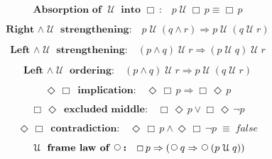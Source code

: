 \documentclass[12pt, fleqn, leqno]{article}
\newcommand{\equivs}{\ensuremath{\;\equiv\;}}       %
\newcommand{\impl}{\ensuremath{\Rightarrow}}        %
\newcommand{\Until}{\;\mathcal{U}\;}
\newcommand{\Next}{\;\,\text{\raisebox{3.5pt}{\circle{6}}}}
\newcommand{\Event}{\Diamond\,}
\newcommand{\Always}{\Box\,}
\newcommand{\spacer}{\vspace{-30pt}}
\newcommand{\firstspacer}{\vspace{-26pt}}
\begin{document}
\firstspacer

\begin{equation}\label{E:axAbsorpUntil}
\textbf{Absorption of $\Until$ into $\Always$:}\quad p \Until \Always p \equiv \Always p
\end{equation}

\spacer

\begin{equation}\label{E:untilAndImplUntilUntil}
\textbf{Right $\land\Until$ strengthening:}\quad p\Until(q \land r) \impl p\Until(q\Until r)
\end{equation}

\spacer

\begin{equation}\label{E:andUntilImplUntilUntil}
\textbf{Left $\land\Until$ strengthening:}\quad (p \land q) \Until r \impl (p\Until q)\Until r
\end{equation}

\spacer

\begin{equation}\label{E:leftStrengthUntil}
\textbf{Left $\land\Until$ ordering:}\quad (p \land q) \Until r \impl p\Until (q\Until r)
\end{equation}

\spacer

\begin{equation}\label{E:eventAlwaysImp}
\textbf{$\Event \Always$ implication:}\quad \Event\Always p \impl \Always\Event p
\end{equation}

\spacer

\begin{equation}\label{E:AEexcludedMid2}
\textbf{$\Always \Event $ excluded middle:}\quad \Always \Event p \lor \Always \Event\neg p
\end{equation}

\spacer

\begin{equation}\label{E:EAcontradiction2}
\textbf{$\Event \Always$ contradiction:}\quad \Event \Always p \land \Event \Always \neg p \equivs false
\end{equation}

\spacer

\begin{equation}\label{E:untilframelawnext}
\textbf{$\Until$ frame law of $\Next$:}\quad \Always p \impl (\Next q \impl \Next (p \Until q))
\end{equation}
\end{document}
